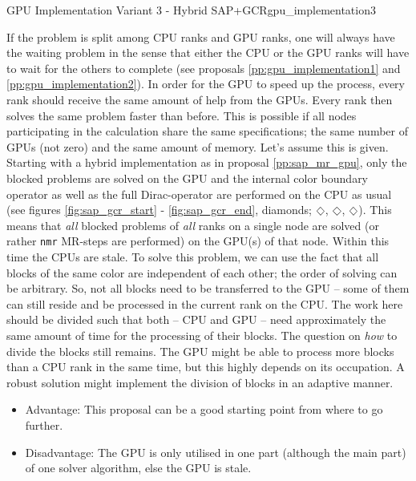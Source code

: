 \documentclass{article}
\DeclareRobustCommand{\diamond}{%
  \mathbin{\text{\scalebox{.75}{\rotatebox[origin=c]{45}{$\Box$}}}}%
}
\theoremstyle{plain} %
\theoremstyle{convention} %
\theoremstyle{remark} %
\def\code#1{\texttt{#1}}
\numberwithin{equation}{section}
\begin{document}
\begin{proposal}{GPU Implementation Variant 3 - Hybrid SAP+GCR}{gpu_implementation3} %

If the problem is split among CPU ranks and GPU ranks, one will always have the waiting problem in the sense that either the CPU or the GPU ranks will have to wait for the others to complete (see proposals \ref{pp:gpu_implementation1} and \ref{pp:gpu_implementation2}). In order for the GPU to speed up the process, every rank should receive the same amount of help from the GPUs. Every rank then solves the same problem faster than before. This is possible if all nodes participating in the calculation share the same specifications; the same number of GPUs (not zero) and the same amount of memory. Let's assume this is given. Starting with a hybrid implementation as in proposal \ref{pp:sap_mr_gpu}, only the blocked problems are solved on the GPU and the internal color boundary operator as well as the full Dirac-operator are performed on the CPU as usual (see figures \ref{fig:sap_gcr_start} - \ref{fig:sap_gcr_end}, diamonds; \textcolor{cbrown}{$\diamond$}, \textcolor{cred}{$\diamond$}, \textcolor{cblue}{$\diamond$}). This means that \textit{all} blocked problems of \textit{all} ranks on a single node are solved (or rather \code{nmr} MR-steps are performed) on the GPU(s) of that node. Within this time the CPUs are stale. To solve this problem, we can use the fact that all blocks of the same color are independent of each other; the order of solving can be arbitrary. So, not all blocks need to be transferred to the GPU -- some of them can still reside and be processed in the current rank on the CPU. The work here should be divided such that both -- CPU and GPU -- need approximately the same amount of time for the processing of their blocks. The question on \textit{how} to divide the blocks still remains. The GPU might be able to process more blocks than a CPU rank in the same time, but this highly depends on its occupation. A robust solution might implement the division of blocks in an adaptive manner.

\begin{itemize}
    \item Advantage: This proposal can be a good starting point from where to go further.
    \item Disadvantage: The GPU is only utilised in one part (although the main part) of one solver algorithm, else the GPU is stale.
\end{itemize}

\end{proposal}
\end{document}
